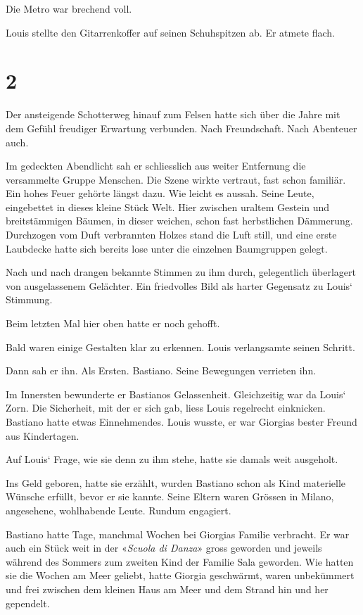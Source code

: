Die Metro war brechend voll.

Louis stellte den Gitarrenkoffer auf seinen Schuhspitzen ab. Er atmete
flach.

\chapter{2}\label{section-1}

Der ansteigende Schotterweg hinauf zum Felsen hatte sich über die Jahre
mit dem Gefühl freudiger Erwartung verbunden. Nach Freundschaft. Nach
Abenteuer auch.

Im gedeckten Abendlicht sah er schliesslich aus weiter Entfernung die
versammelte Gruppe Menschen. Die Szene wirkte vertraut, fast schon
familiär. Ein hohes Feuer gehörte längst dazu. Wie leicht es aussah.
Seine Leute, eingebettet in dieses kleine Stück Welt. Hier zwischen
uraltem Gestein und breitstämmigen Bäumen, in dieser weichen, schon fast
herbstlichen Dämmerung. Durchzogen vom Duft verbrannten Holzes stand die
Luft still, und eine erste Laubdecke hatte sich bereits lose unter die
einzelnen Baumgruppen gelegt.

Nach und nach drangen bekannte Stimmen zu ihm durch, gelegentlich
überlagert von ausgelassenem Gelächter. Ein friedvolles Bild als harter
Gegensatz zu Louis` Stimmung.

Beim letzten Mal hier oben hatte er noch gehofft.

Bald waren einige Gestalten klar zu erkennen. Louis verlangsamte seinen
Schritt.

Dann sah er ihn. Als Ersten. Bastiano. Seine Bewegungen verrieten ihn.

Im Innersten bewunderte er Bastianos Gelassenheit. Gleichzeitig war da
Louis` Zorn. Die Sicherheit, mit der er sich gab, liess Louis regelrecht
einknicken. Bastiano hatte etwas Einnehmendes. Louis wusste, er war
Giorgias bester Freund aus Kindertagen.

Auf Louis` Frage, wie sie denn zu ihm stehe, hatte sie damals weit
ausgeholt.

Ins Geld geboren, hatte sie erzählt, wurden Bastiano schon als Kind
materielle Wünsche erfüllt, bevor er sie kannte. Seine Eltern waren
Grössen in Milano, angesehene, wohlhabende Leute. Rundum engagiert.

Bastiano hatte Tage, manchmal Wochen bei Giorgias Familie verbracht. Er
war auch ein Stück weit in der «\emph{Scuola di Danza}» gross geworden
und jeweils während des Sommers zum zweiten Kind der Familie Sala
geworden. Wie hatten sie die Wochen am Meer geliebt, hatte Giorgia
geschwärmt, waren unbekümmert und frei zwischen dem kleinen Haus am Meer
und dem Strand hin und her gependelt.

